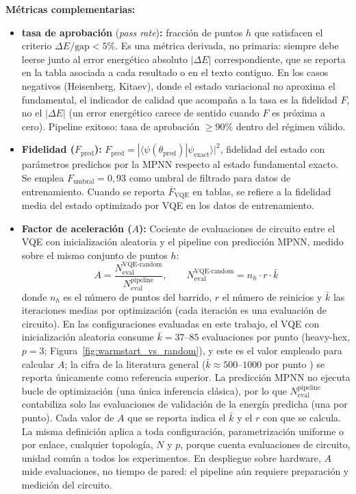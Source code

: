 \documentclass[11pt,a4paper,spanish]{book}
\begin{document}
\textbf{Métricas complementarias:}
\begin{itemize}
    \item \textbf{tasa de aprobación} (\emph{pass rate})\textbf{:} fracción de puntos $h$ que satisfacen el criterio $\Delta E/\text{gap} < 5\%$. Es una métrica derivada, no primaria: siempre debe leerse junto al error energético absoluto $|\Delta E|$ correspondiente, que se reporta en la tabla asociada a cada resultado o en el texto contiguo. En los casos negativos (Heisenberg, Kitaev), donde el estado variacional no aproxima el fundamental, el indicador de calidad que acompaña a la tasa es la fidelidad $F$, no el $|\Delta E|$ (un error energético carece de sentido cuando $F$ es próxima a cero). Pipeline exitoso: tasa de aprobación $\geq 90\%$ dentro del régimen válido.
    \item \textbf{Fidelidad ($F_{\text{pred}}$):} $F_{\text{pred}} = |\langle \psi(\theta_{\text{pred}}) | \psi_{\text{exact}} \rangle|^2$, fidelidad del estado con parámetros predichos por la MPNN respecto al estado fundamental exacto. Se emplea $F_{\text{umbral}} = 0,93$ como umbral de filtrado para datos de entrenamiento. Cuando se reporta $\bar{F}_{\text{VQE}}$ en tablas, se refiere a la fidelidad media del estado optimizado por VQE en los datos de entrenamiento.
    \item \textbf{Factor de aceleración ($A$):} Cociente de evaluaciones de circuito entre el VQE con inicialización aleatoria y el pipeline con predicción MPNN, medido sobre el mismo conjunto de puntos $h$:
    \begin{equation}
    A = \frac{N_{\text{eval}}^{\text{VQE-random}}}{N_{\text{eval}}^{\text{pipeline}}}, \qquad N_{\text{eval}}^{\text{VQE-random}} = n_h \cdot r \cdot \bar{k}
    \label{eq:speedup}
    \end{equation}
    donde $n_h$ es el número de puntos del barrido, $r$ el número de reinicios y $\bar{k}$ las iteraciones medias por optimización (cada iteración es una evaluación de circuito). En las configuraciones evaluadas en este trabajo, el VQE con inicialización aleatoria consume $\bar{k} = 37$--$85$ evaluaciones por punto (heavy-hex, $p = 3$; Figura~\ref{fig:warmstart_vs_random}), y este es el valor empleado para calcular $A$; la cifra de la literatura general ($\bar{k} \approx 500$--$1000$ por punto \citep{tilly2022}) se reporta únicamente como referencia superior. La predicción MPNN no ejecuta bucle de optimización (una única inferencia clásica), por lo que $N_{\text{eval}}^{\text{pipeline}}$ contabiliza solo las evaluaciones de validación de la energía predicha (una por punto). Cada valor de $A$ que se reporta indica el $\bar{k}$ y el $r$ con que se calcula. La misma definición aplica a toda configuración, parametrización uniforme o por enlace, cualquier topología, $N$ y $p$, porque cuenta evaluaciones de circuito, unidad común a todos los experimentos. En despliegue sobre hardware, $A$ mide evaluaciones, no tiempo de pared: el pipeline aún requiere preparación y medición del circuito.

\end{itemize}
\end{document}
